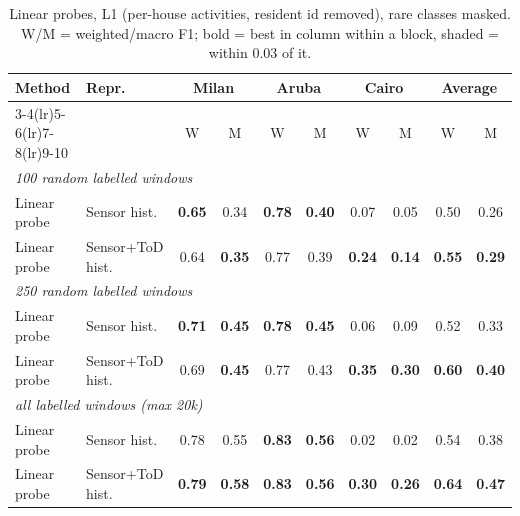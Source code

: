\begin{table}[H]
\centering\small
\caption{Linear probes, L1 (per-house activities, resident id removed), rare classes masked. W/M = weighted/macro F1; bold = best in column within a block, shaded = within 0.03 of it.}
\label{tab:probe_l1_masked}
\setlength{\tabcolsep}{3.5pt}
\begin{tabular}{llcc|cc|cc|cc}
\toprule
Method & Repr. & \multicolumn{2}{c}{Milan} & \multicolumn{2}{c}{Aruba} & \multicolumn{2}{c}{Cairo} & \multicolumn{2}{c}{Average} \\
\cmidrule(lr){3-4}\cmidrule(lr){5-6}\cmidrule(lr){7-8}\cmidrule(lr){9-10}
 & & W & M & W & M & W & M & W & M \\
\midrule
\multicolumn{10}{l}{\textit{100 random labelled windows}} \\
\midrule
Linear probe & Sensor hist. & \cellcolor{blue!12}\textbf{0.65} & \cellcolor{blue!12}0.34 & \cellcolor{blue!12}\textbf{0.78} & \cellcolor{blue!12}\textbf{0.40} & 0.07 & 0.05 & 0.50 & \cellcolor{blue!12}0.26 \\
Linear probe & Sensor+ToD hist. & \cellcolor{blue!12}0.64 & \cellcolor{blue!12}\textbf{0.35} & \cellcolor{blue!12}0.77 & \cellcolor{blue!12}0.39 & \cellcolor{blue!12}\textbf{0.24} & \cellcolor{blue!12}\textbf{0.14} & \cellcolor{blue!12}\textbf{0.55} & \cellcolor{blue!12}\textbf{0.29} \\
\midrule
\multicolumn{10}{l}{\textit{250 random labelled windows}} \\
\midrule
Linear probe & Sensor hist. & \cellcolor{blue!12}\textbf{0.71} & \cellcolor{blue!12}\textbf{0.45} & \cellcolor{blue!12}\textbf{0.78} & \cellcolor{blue!12}\textbf{0.45} & 0.06 & 0.09 & 0.52 & 0.33 \\
Linear probe & Sensor+ToD hist. & \cellcolor{blue!12}0.69 & \cellcolor{blue!12}\textbf{0.45} & \cellcolor{blue!12}0.77 & \cellcolor{blue!12}0.43 & \cellcolor{blue!12}\textbf{0.35} & \cellcolor{blue!12}\textbf{0.30} & \cellcolor{blue!12}\textbf{0.60} & \cellcolor{blue!12}\textbf{0.40} \\
\midrule
\multicolumn{10}{l}{\textit{all labelled windows (max 20k)}} \\
\midrule
Linear probe & Sensor hist. & \cellcolor{blue!12}0.78 & 0.55 & \cellcolor{blue!12}\textbf{0.83} & \cellcolor{blue!12}\textbf{0.56} & 0.02 & 0.02 & 0.54 & 0.38 \\
Linear probe & Sensor+ToD hist. & \cellcolor{blue!12}\textbf{0.79} & \cellcolor{blue!12}\textbf{0.58} & \cellcolor{blue!12}\textbf{0.83} & \cellcolor{blue!12}\textbf{0.56} & \cellcolor{blue!12}\textbf{0.30} & \cellcolor{blue!12}\textbf{0.26} & \cellcolor{blue!12}\textbf{0.64} & \cellcolor{blue!12}\textbf{0.47} \\
\bottomrule
\end{tabular}
\end{table}

